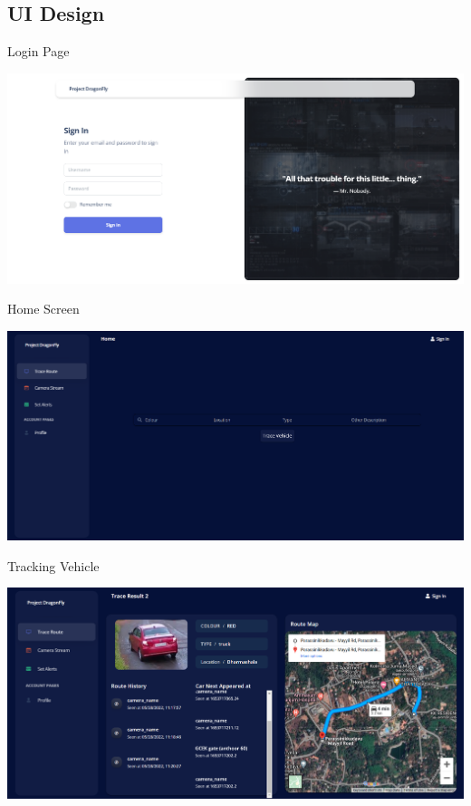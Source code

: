 \documentclass{beamer}
\begin{document}
	\subsection{UI Design}
	\begin{frame}{Login Page}
		\begin{center}
			 \includegraphics[width=\linewidth]{res/login.png}
		\end{center}
 	\end{frame}
	 
	\begin{frame}{Home Screen}
		\begin{center}
			\includegraphics[width=\linewidth]{res/home.png}
		\end{center}
	\end{frame}

 
	 \begin{frame}{Tracking Vehicle}
	 	\begin{center}
	 		\includegraphics[width=\linewidth]{res/tracing.png}
	 	\end{center}
	 \end{frame}
 
\end{document}
